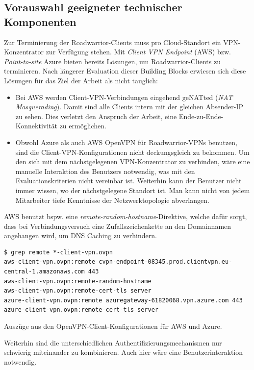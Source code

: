 \subsection{Vorauswahl geeigneter technischer Komponenten}
Zur Terminierung der Roadwarrior-Clients muss pro Cloud-Standort ein VPN-Konzentrator zur Verfügung stehen. Mit \textit{Client VPN Endpoint} (AWS) bzw. \textit{Point-to-site} Azure bieten bereits Lösungen, um Roadwarrior-Clients zu terminieren. Nach längerer Evaluation dieser Building Blocks erwiesen sich diese Lösungen für das Ziel der Arbeit als nicht tauglich:
\begin{itemize}
\item Bei AWS werden Client-VPN-Verbindungen eingehend geNATted (\textit{NAT Masquerading}). Damit sind alle Clients intern mit der gleichen Absender-IP zu sehen. Dies verletzt den Anspruch der Arbeit, eine Ende-zu-Ende-Konnektivität zu ermöglichen.
\item Obwohl Azure als auch AWS OpenVPN für Roadwarrior-VPNs benutzen, sind die Client-VPN-Konfigurationen nicht \glqq deckungsgleich\grqq{} zu bekommen. Um den sich mit dem nächstgelegenen VPN-Konzentrator zu verbinden, wäre eine manuelle Interaktion des Benutzers notwendig, was mit den Evaluationskriterien nicht vereinbar ist. Weiterhin kann der Benutzer nicht immer wissen, wo der nächstgelegene Standort ist. Man kann nicht von jedem Mitarbeiter tiefe Kenntnisse der Netzwerktopologie abverlangen.
\end{itemize}
AWS benutzt bspw. eine \textit{remote-random-hostname}-Direktive, welche dafür sorgt, dass bei Verbindungsversuch eine Zufallszeichenkette an den Domainnamen angehangen wird, um DNS Caching zu verhindern.
\begin{listing}[h]
\begin{verbatim}
$ grep remote *-client-vpn.ovpn
aws-client-vpn.ovpn:remote cvpn-endpoint-08345.prod.clientvpn.eu-central-1.amazonaws.com 443
aws-client-vpn.ovpn:remote-random-hostname
aws-client-vpn.ovpn:remote-cert-tls server
azure-client-vpn.ovpn:remote azuregateway-61820068.vpn.azure.com 443
azure-client-vpn.ovpn:remote-cert-tls server

\end{verbatim}
\caption{Auszüge aus den OpenVPN-Client-Konfigurationen für AWS und Azure.}
\label{ovpn-client-config-remote}
\end{listing}
Weiterhin sind die unterschiedlichen Authentifizierungsmechanismen nur schwierig miteinander zu kombinieren. Auch hier wäre eine Benutzerinteraktion notwendig.\\
